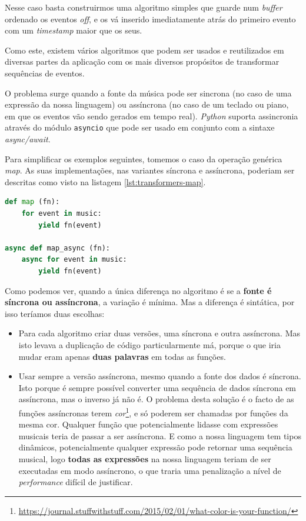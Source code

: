 Nesse caso basta construirmos uma algoritmo simples que guarde num \textit{buffer} ordenado os eventos \textit{off}, e os vá inserido imediatamente atrás do primeiro evento com um \textit{timestamp} maior que os seus.

Como este, existem vários algoritmos que podem ser usados e reutilizados em diversas partes da aplicação com os mais diversos propósitos de transformar sequências de eventos.

O problema surge quando a fonte da música pode ser sincrona (no caso de uma expressão da nossa linguagem) ou assíncrona (no caso de um teclado ou piano, em que os eventos vão sendo gerados em tempo real). \textit{Python} suporta assincronia através do módulo \texttt{asyncio} que pode ser usado em conjunto com a sintaxe \textit{async/await}.

Para simplificar os exemplos seguintes, tomemos o caso da operação genérica \textit{map}. As suas implementações, nas variantes síncrona e assíncrona, poderiam ser descritas como visto na listagem \ref{lst:transformers-map}.

\begin{lstlisting}[caption={Exemplo de uma função \texttt{map} com versões sincronas e asíncronas},label={lst:transformers-map},language=Python]
def map (fn):
    for event in music:
        yield fn(event)

async def map_async (fn):
    async for event in music:
        yield fn(event)
\end{lstlisting}

Como podemos ver, quando a única diferença no algoritmo é se a \textbf{fonte é síncrona ou assíncrona}, a variação é mínima. Mas a diferença é sintática, por isso teríamos duas escolhas:
\begin{itemize}
 \item Para cada algoritmo criar duas versões, uma síncrona e outra assíncrona. Mas isto levava a duplicação de código particularmente má, porque o que iria mudar eram apenas \textbf{duas palavras} em todas as funções.
 
 \item Usar sempre a versão assíncrona, mesmo quando a fonte dos dados é síncrona. Isto porque é sempre possível converter uma sequência de dados síncrona em assíncrona, mas o inverso já não é. O problema desta solução é o facto de as funções assíncronas terem \textit{cor}\footnote{\url{https://journal.stuffwithstuff.com/2015/02/01/what-color-is-your-function/}}, e só poderem ser chamadas por funções da mesma cor. Qualquer função que potencialmente lidasse com expressões musicais teria de passar a ser assíncrona. E como a nossa linguagem tem tipos dinâmicos, potencialmente qualquer expressão pode retornar uma sequência musical, logo \textbf{todas as expressões} na nossa linguagem teriam de ser executadas em modo assíncrono, o que traria uma penalização a nível de \textit{performance} difícil de justificar.
\end{itemize}


